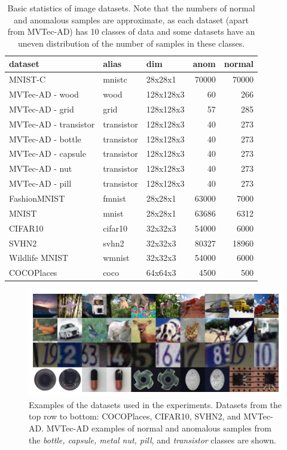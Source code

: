 \begin{table}
    \centering
    \tabcolsep=0.1cm
    \begin{tabular}{lllrr}
    \toprule
    \textbf{dataset} & \textbf{alias} & \textbf{dim} & \textbf{anom} & \textbf{normal} \\
    \midrule
    MNIST-C & mnistc & 28x28x1 & 70000 & 70000 \\
    MVTec-AD - wood & wood & 128x128x3 & 60 & 266 \\
    MVTec-AD - grid & grid & 128x128x3 & 57 & 285 \\
    MVTec-AD - transistor & transistor & 128x128x3 & 40 & 273 \\
    MVTec-AD - bottle & transistor & 128x128x3 & 40 & 273 \\
    MVTec-AD - capsule & transistor & 128x128x3 & 40 & 273 \\
    MVTec-AD - nut & transistor & 128x128x3 & 40 & 273 \\
    MVTec-AD - pill & transistor & 128x128x3 & 40 & 273 \\
    FashionMNIST & fmnist & 28x28x1 & 63000 & 7000   \\
    MNIST & mnist & 28x28x1 & 63686 & 6312  \\
    CIFAR10 & cifar10 & 32x32x3 & 54000 & 6000  \\
    SVHN2 & svhn2 & 32x32x3 & 80327 & 18960  \\
    Wildlife MNIST & wmnist & 32x32x3 & 54000 & 6000  \\
    COCOPlaces & coco & 64x64x3 & 4500 & 500  \\\bottomrule
    \end{tabular}
    \vspace*{0.15cm}
    \caption{Basic statistics of image datasets. Note that the numbers of normal and anomalous samples are approximate, as each dataset (apart from MVTec-AD) has 10 classes of data and some datasets have an uneven distribution of the number of samples in these classes.}
    \label{tab:image_datasets}
\end{table}
    


\begin{figure}
    \centering
    \includegraphics[width=\textwidth]{data/chapter_sgvaegan/fig5_all_grid.png}
    \caption{Examples of the datasets used in the experiments. Datasets from the top row to bottom: COCOPlaces, CIFAR10, SVHN2, and MVTec-AD. MVTec-AD examples of normal and anomalous samples from the \textit{bottle, capsule, metal nut, pill}, and \textit{transistor} classes are shown.}
    \label{fig:all_grid}
\end{figure}
